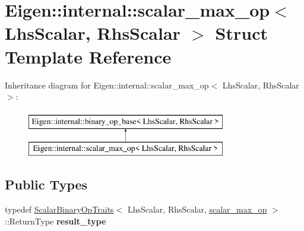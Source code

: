 \hypertarget{struct_eigen_1_1internal_1_1scalar__max__op}{}\section{Eigen\+::internal\+::scalar\+\_\+max\+\_\+op$<$ Lhs\+Scalar, Rhs\+Scalar $>$ Struct Template Reference}
\label{struct_eigen_1_1internal_1_1scalar__max__op}
Inheritance diagram for Eigen\+::internal\+::scalar\+\_\+max\+\_\+op$<$ Lhs\+Scalar, Rhs\+Scalar $>$\+:\begin{figure}[H]
\begin{center}
\leavevmode
\includegraphics[height=2.000000cm]{struct_eigen_1_1internal_1_1scalar__max__op}
\end{center}
\end{figure}
\subsection*{Public Types}
\begin{DoxyCompactItemize}
\item 
\mbox{\label{struct_eigen_1_1internal_1_1scalar__max__op_abb699f2eecedbfc3fe139729e604cd8d}} 
typedef \mbox{\hyperlink{struct_eigen_1_1_scalar_binary_op_traits}{Scalar\+Binary\+Op\+Traits}}$<$ Lhs\+Scalar, Rhs\+Scalar, \mbox{\hyperlink{struct_eigen_1_1internal_1_1scalar__max__op}{scalar\+\_\+max\+\_\+op}} $>$\+::Return\+Type {\bfseries result\+\_\+type}
\end{DoxyCompactItemize}
